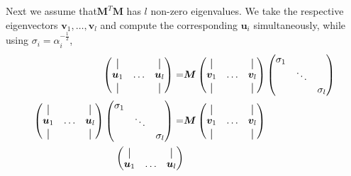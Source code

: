     Next we assume that$\bm{M}^T \bm{M}$ has $l$  non-zero eigenvalues.
    We take the respective eigenvectors $\bm{v}_1, \hdots, \bm{v}_l$  and compute the corresponding $\bm{u}_i$ 
    simultaneously, while using $\sigma_i=\alpha_i^{-\frac{1}{2}}$,
    \begin{align}
        \begin{pmatrix}
        \vertbar &        & \vertbar \\
        \bm{u}_1 & \hdots & \bm{u}_l \\
        \vertbar &        & \vertbar 
        \end{pmatrix} =&
        \bm{M}
        \begin{pmatrix}
        \vertbar &        & \vertbar \\
        \bm{v}_1 & \hdots & \bm{v}_l \\
        \vertbar &        & \vertbar 
        \end{pmatrix}
        \begin{pmatrix}
        \sigma_1 &        &          \\
                 & \ddots &          \\ 
                 &        & \sigma_l
        \end{pmatrix} \\
        \begin{pmatrix}
        \vertbar &        & \vertbar \\
        \bm{u}_1 & \hdots & \bm{u}_l \\
        \vertbar &        & \vertbar 
        \end{pmatrix}
        \begin{pmatrix}
            \sigma_1 &        &          \\
                     & \ddots &          \\ 
                     &        & \sigma_l
            \end{pmatrix}
        =&
        \bm{M}
        \begin{pmatrix}
        \vertbar &        & \vertbar \\
        \bm{v}_1 & \hdots & \bm{v}_l \\
        \vertbar &        & \vertbar 
        \end{pmatrix} \\
        \begin{pmatrix}
        \vertbar &        & \vertbar \\
        \bm{u}_1 & \hdots & \bm{u}_l \\

\end{pmatrix}
\end{align}

